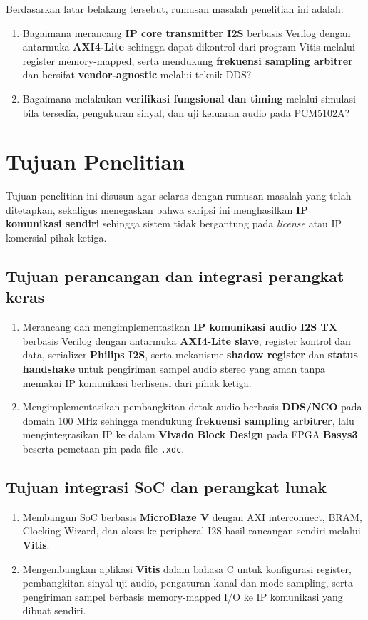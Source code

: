 Berdasarkan latar belakang tersebut, rumusan masalah penelitian ini adalah:

\begin{enumerate}
	\item Bagaimana merancang \textbf{IP core transmitter I2S} berbasis Verilog dengan antarmuka \textbf{AXI4-Lite} sehingga dapat dikontrol dari program Vitis melalui register memory-mapped, serta mendukung \textbf{frekuensi sampling arbitrer} dan bersifat \textbf{vendor-agnostic} melalui teknik DDS?
	\item Bagaimana melakukan \textbf{verifikasi fungsional dan timing} melalui simulasi bila tersedia, pengukuran sinyal, dan uji keluaran audio pada PCM5102A?
\end{enumerate}

\section{Tujuan Penelitian}

Tujuan penelitian ini disusun agar selaras dengan rumusan masalah yang telah ditetapkan, sekaligus menegaskan bahwa skripsi ini menghasilkan \textbf{IP komunikasi sendiri} sehingga sistem tidak bergantung pada \textit{license} atau IP komersial pihak ketiga.

\subsection{Tujuan perancangan dan integrasi perangkat keras}
\begin{enumerate}
	\item Merancang dan mengimplementasikan \textbf{IP komunikasi audio I2S TX} berbasis Verilog dengan antarmuka \textbf{AXI4-Lite slave}, register kontrol dan data, serializer \textbf{Philips I2S}, serta mekanisme \textbf{shadow register} dan \textbf{status handshake} untuk pengiriman sampel audio stereo yang aman tanpa memakai IP komunikasi berlisensi dari pihak ketiga.
	\item Mengimplementasikan pembangkitan detak audio berbasis \textbf{DDS/NCO} pada domain 100 MHz sehingga mendukung \textbf{frekuensi sampling arbitrer}, lalu mengintegrasikan IP ke dalam \textbf{Vivado Block Design} pada FPGA \textbf{Basys3} beserta pemetaan pin pada file \texttt{.xdc}.
\end{enumerate}

\subsection{Tujuan integrasi SoC dan perangkat lunak}
\begin{enumerate}
	\item Membangun SoC berbasis \textbf{MicroBlaze V} dengan AXI interconnect, BRAM, Clocking Wizard, dan akses ke peripheral I2S hasil rancangan sendiri melalui \textbf{Vitis}.
	\item Mengembangkan aplikasi \textbf{Vitis} dalam bahasa C untuk konfigurasi register, pembangkitan sinyal uji audio, pengaturan kanal dan mode sampling, serta pengiriman sampel berbasis memory-mapped I/O ke IP komunikasi yang dibuat sendiri.
\end{enumerate}

